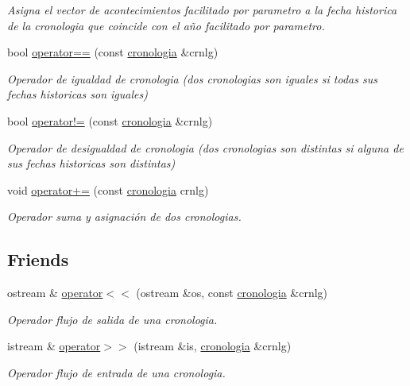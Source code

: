 \begin{DoxyCompactItemize}
\begin{DoxyCompactList}\small\item\em Asigna el vector de acontecimientos facilitado por parametro a la fecha historica de la cronologia que coincide con el año facilitado por parametro. \end{DoxyCompactList}\item 
bool \hyperlink{classcronologia_ac5d7a4ef4784309b0c747ada00802168}{operator==} (const \hyperlink{classcronologia}{cronologia} \&crnlg)
\begin{DoxyCompactList}\small\item\em Operador de igualdad de cronologia (dos cronologias son iguales si todas sus fechas historicas son iguales) \end{DoxyCompactList}\item 
bool \hyperlink{classcronologia_ad689f689c3ffbb328b5916ad0b2f6048}{operator!=} (const \hyperlink{classcronologia}{cronologia} \&crnlg)
\begin{DoxyCompactList}\small\item\em Operador de desigualdad de cronologia (dos cronologias son distintas si alguna de sus fechas historicas son distintas) \end{DoxyCompactList}\item 
void \hyperlink{classcronologia_a4379af6e3dcd4a3fcd987264fcf87876}{operator+=} (const \hyperlink{classcronologia}{cronologia} crnlg)
\begin{DoxyCompactList}\small\item\em Operador suma y asignación de dos cronologias. \end{DoxyCompactList}\end{DoxyCompactItemize}
\subsection*{Friends}
\begin{DoxyCompactItemize}
\item 
ostream \& \hyperlink{classcronologia_abdebf1d5b2987216a67b4c92249c2d2f}{operator$<$$<$} (ostream \&os, const \hyperlink{classcronologia}{cronologia} \&crnlg)
\begin{DoxyCompactList}\small\item\em Operador flujo de salida de una cronologia. \end{DoxyCompactList}\item 
istream \& \hyperlink{classcronologia_af051a205a01dbb15fc00dc52d66e8b1a}{operator$>$$>$} (istream \&is, \hyperlink{classcronologia}{cronologia} \&crnlg)
\begin{DoxyCompactList}\small\item\em Operador flujo de entrada de una cronologia. \end{DoxyCompactList}\end{DoxyCompactItemize}


